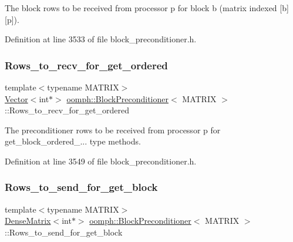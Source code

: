 The block rows to be received from processor p for block b (matrix indexed \mbox{[}b\mbox{]}\mbox{[}p\mbox{]}). 



Definition at line 3533 of file block\+\_\+preconditioner.\+h.

\mbox{\label{classoomph_1_1BlockPreconditioner_a68830fbf53861f7b2e3e6a1b4843f6b2}} 
\subsubsection{\texorpdfstring{Rows\+\_\+to\+\_\+recv\+\_\+for\+\_\+get\+\_\+ordered}{Rows\_to\_recv\_for\_get\_ordered}}
{\footnotesize\ttfamily template$<$typename M\+A\+T\+R\+IX$>$ \\
\hyperlink{classoomph_1_1Vector}{Vector}$<$int$\ast$$>$ \hyperlink{classoomph_1_1BlockPreconditioner}{oomph\+::\+Block\+Preconditioner}$<$ M\+A\+T\+R\+IX $>$\+::Rows\+\_\+to\+\_\+recv\+\_\+for\+\_\+get\+\_\+ordered\hspace{0.3cm}{\ttfamily [private]}}



The preconditioner rows to be received from processor p for get\+\_\+block\+\_\+ordered\+\_\+... type methods. 



Definition at line 3549 of file block\+\_\+preconditioner.\+h.

\mbox{\label{classoomph_1_1BlockPreconditioner_ac24e5ec4afe8904b3de7975ff0b2649d}} 
\subsubsection{\texorpdfstring{Rows\+\_\+to\+\_\+send\+\_\+for\+\_\+get\+\_\+block}{Rows\_to\_send\_for\_get\_block}}
{\footnotesize\ttfamily template$<$typename M\+A\+T\+R\+IX$>$ \\
\hyperlink{classoomph_1_1DenseMatrix}{Dense\+Matrix}$<$int$\ast$$>$ \hyperlink{classoomph_1_1BlockPreconditioner}{oomph\+::\+Block\+Preconditioner}$<$ M\+A\+T\+R\+IX $>$\+::Rows\+\_\+to\+\_\+send\+\_\+for\+\_\+get\+\_\+block\hspace{0.3cm}{\ttfamily [private]}}



